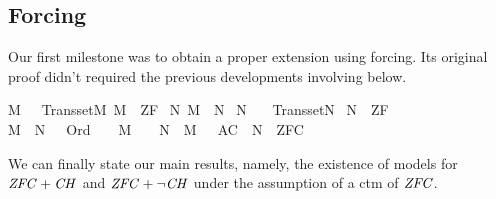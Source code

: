 \subsection{Forcing \label{sec:def-main-forcing}%
}
Our first milestone was to obtain a proper extension using forcing.
Its original proof didn't required the previous developments involving
below.%
\begin{isabelle}%
{\isasymlbrakk}M\ {\isasymapprox}\ {\isasymomega}{\isacharsemicolon}{\kern0pt}\ Transset{\isacharparenleft}{\kern0pt}M{\isacharparenright}{\kern0pt}{\isacharsemicolon}{\kern0pt}\ M\ {\isasymTurnstile}\ ZF{\isasymrbrakk}\isanewline
{\isasymLongrightarrow}\ {\isasymexists}N{\isachardot}{\kern0pt}\ M\ {\isasymsubseteq}\ N\ {\isasymand}\isanewline
{}N\ {\isasymapprox}\ {\isasymomega}\ {\isasymand}\isanewline
{}Transset{\isacharparenleft}{\kern0pt}N{\isacharparenright}{\kern0pt}\ {\isasymand}\isanewline
{}N\ {\isasymTurnstile}\ ZF\ {\isasymand}\isanewline
{}M\ {\isasymnoteq}\ N\ {\isasymand}\ {\isacharparenleft}{\kern0pt}{\isasymforall}{\isasymalpha}{\isachardot}{\kern0pt}\ Ord{\isacharparenleft}{\kern0pt}{\isasymalpha}{\isacharparenright}{\kern0pt}\ {\isasymlongrightarrow}\ {\isasymalpha}\ {\isasymin}\ M\ {\isasymlongleftrightarrow}\ {\isasymalpha}\ {\isasymin}\ N{\isacharparenright}{\kern0pt}\ {\isasymand}\ {\isacharparenleft}{\kern0pt}{\isacharparenleft}{\kern0pt}M{\isacharcomma}{\kern0pt}\ {\isacharbrackleft}{\kern0pt}{\isacharbrackright}{\kern0pt}\ {\isasymTurnstile}\ {\isasymcdot}AC{\isasymcdot}{\isacharparenright}{\kern0pt}\ {\isasymlongrightarrow}\ N\ {\isasymTurnstile}\ ZFC{\isacharparenright}{\kern0pt}%
\end{isabelle}%
We can finally state our main results, namely, the existence of models
for $\mathit{ZFC} + \mathit{CH}$ and $\mathit{ZFC} + \neg\mathit{CH}$ under the assumption of a ctm of $\mathit{ZFC}$.%
